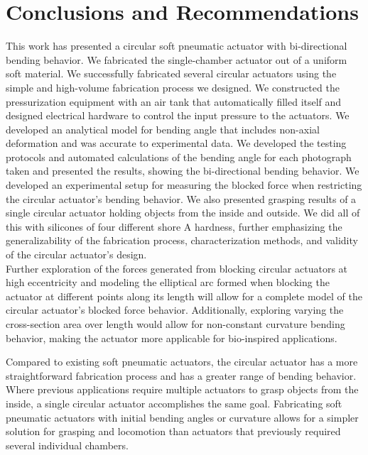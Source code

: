 \chapter{Conclusions and Recommendations}

This work has presented a circular soft pneumatic actuator with bi-directional bending behavior. We fabricated the single-chamber actuator out of a uniform soft material. We successfully fabricated several circular actuators using the simple and high-volume fabrication process we designed. We constructed the pressurization equipment with an air tank that automatically filled itself and designed electrical hardware to control the input pressure to the actuators. We developed an analytical model for bending angle that includes non-axial deformation and was accurate to experimental data. We developed the testing protocols and automated calculations of the bending angle for each photograph taken and presented the results, showing the bi-directional bending behavior. We developed an experimental setup for measuring the blocked force when restricting the circular actuator's bending behavior. We also presented grasping results of a single circular actuator holding objects from the inside and outside. We did all of this with silicones of four different shore A hardness, further emphasizing the generalizability of the fabrication process, characterization methods, and validity of the circular actuator's design. \\

Further exploration of the forces generated from blocking circular actuators at high eccentricity and modeling the elliptical arc formed when blocking the actuator at different points along its length will allow for a complete model of the circular actuator's blocked force behavior. Additionally, exploring varying the cross-section area over length would allow for non-constant curvature bending behavior, making the actuator more applicable for bio-inspired applications. 

Compared to existing soft pneumatic actuators, the circular actuator has a more straightforward fabrication process and has a greater range of bending behavior. Where previous applications require multiple actuators to grasp objects from the inside, a single circular actuator accomplishes the same goal. Fabricating soft pneumatic actuators with initial bending angles or curvature allows for a simpler solution for grasping and locomotion than actuators that previously required several individual chambers. 

